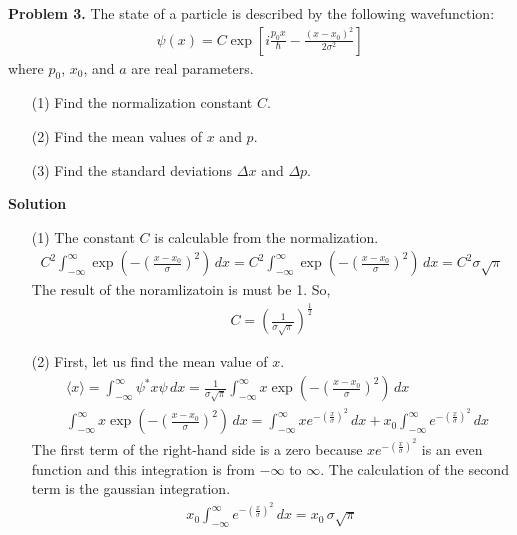 \documentclass[floatfix,nofootinbib,superscriptaddress,fleqn]{revtex4}
\begin{document}
\noindent \textbf{Problem 3.} 
The state of a particle is described by the following wavefunction:
\begin{align*}
\psi(x) = C\exp\left[
i\frac{p_0 x}{\hbar} - \frac{(x-x_0)^2}{2\sigma^2} 
\right]
\end{align*}
where $p_0$, $x_0$, and $a$ are real parameters. 
\begin{itemize}
\item[(1)] Find the normalization constant $C$.
\item[(2)] Find the mean values of $x$ and $p$.
\item[(3)] Find the standard deviations $\Delta x$ and $\Delta p$.
\end{itemize}
\noindent \textbf{Solution}
\begin{itemize}
  \item[(1)] The constant $C$ is calculable from the normalization.
  \begin{align}
    C^2\int_{-\infty}^{\infty} 
    \exp\left(-{\left(\frac{x-x_0}{\sigma} \right)}^2\right)\,dx 
    = C^2\int_{-\infty}^{\infty}
    \exp\left(-{\left(\frac{x-x_0}{\sigma} \right)}^2\right)\,dx 
    = C^2\sigma \sqrt{\pi}
  \end{align}
The result of the noramlizatoin is must be 1. So,
  \begin{align}
    C = {\left(\frac{1}{\sigma \sqrt{\pi}}\right)}^{\frac{1}{2}}
  \end{align}
\item[(2)]First, let us find the mean value of $x$.
  \begin{align}
    &\langle x \rangle=\int_{-\infty}^{\infty}\psi^*x\psi\,dx 
      = \frac{1}{\sigma\sqrt{\pi}}\int_{-\infty}^{\infty} x 
      \exp\left(-{\left( \frac{x-x_0}{\sigma} \right)}^2\right)\,dx \\
    &\int_{-\infty}^{\infty} x 
    \exp\left(-{\left(\frac{x-x_0}{\sigma} \right)}^2\right)\,dx 
      = \int_{-\infty}^{\infty} x e^{-{\left(\frac{x}{\sigma}\right)}^2}\,dx 
        +x_0\int_{-\infty}^{\infty} e^{-{\left(\frac{x}{\sigma}\right)}^2}\,dx
  \end{align}
The first term of the right-hand side is a zero 
because $x e^{-{\left(\frac{x}{\sigma}\right)}^2}$ 
is an even function and this integration is from $-\infty$ to $\infty$. 
The calculation of the second term is the gaussian integration.
  \begin{align}
    x_0\int_{-\infty}^{\infty} e^{-{\left(\frac{x}{\sigma}\right)}^2}\,dx 
    = x_0\,\sigma\sqrt{\pi}
  \end{align}

\end{itemize}
\end{document}
